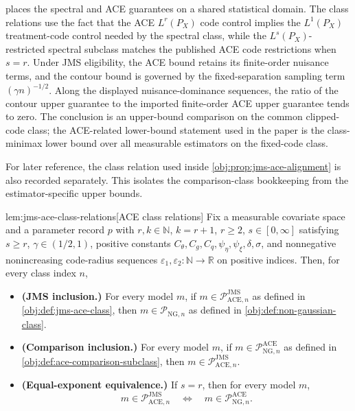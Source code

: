 \documentclass[11pt]{article}
\begin{document}
 places the spectral and ACE guarantees on a shared statistical domain. The class relations use the fact that the ACE \(L^r(P_X)\) code control implies the \(L^1(P_X)\) treatment-code control needed by the spectral class, while the \(L^s(P_X)\)-restricted spectral subclass matches the published ACE code restrictions when \(s=r\). Under JMS eligibility, the ACE bound retains its finite-order nuisance terms, and the contour bound is governed by the fixed-separation sampling term \((\gamma n)^{-1/2}\). Along the displayed nuisance-dominance sequences, the ratio of the contour upper guarantee to the imported finite-order ACE upper guarantee tends to zero. The conclusion is an upper-bound comparison on the common clipped-code class; the ACE-related lower-bound statement used in the paper is the class-minimax lower bound over all measurable estimators on the fixed-code class.

For later reference, the class relation used inside \cref{obj:prop:jms-ace-alignment} is also recorded separately. This isolates the comparison-class bookkeeping from the estimator-specific upper bounds.

\begin{lemmav}{lem:jms-ace-class-relations}[ACE class relations]
Fix a measurable covariate space and a parameter record \(p\) with \(r,k\in\mathbb N\), \(k=r+1\), \(r\ge2\), \(s\in[0,\infty]\) satisfying \(s\ge r\), \(\gamma\in(1/2,1)\), positive constants \(C_{\theta},C_g,C_q,\psi_{\eta},\psi_{\xi},\delta,\sigma\), and nonnegative nonincreasing code-radius sequences \(\varepsilon_1,\varepsilon_2:\mathbb N\to\mathbb R\) on positive indices.  Then, for every class index \(n\),
\begin{itemize}
\item \textbf{(JMS inclusion.)} For every model \(m\), if \(m\in\mathcal P_{\mathrm{ACE},n}^{\mathrm{JMS}}\) as defined in \cref{obj:def:jms-ace-class}, then \(m\in\mathcal P_{\mathrm{NG},n}\) as defined in \cref{obj:def:non-gaussian-class}.
\item \textbf{(Comparison inclusion.)} For every model \(m\), if \(m\in\mathcal P_{\mathrm{NG},n}^{\mathrm{ACE}}\) as defined in \cref{obj:def:ace-comparison-subclass}, then \(m\in\mathcal P_{\mathrm{ACE},n}^{\mathrm{JMS}}\).
\item \textbf{(Equal-exponent equivalence.)} If \(s=r\), then for every model \(m\),
\[
m\in\mathcal P_{\mathrm{ACE},n}^{\mathrm{JMS}}
\quad\Longleftrightarrow\quad
m\in\mathcal P_{\mathrm{NG},n}^{\mathrm{ACE}} .
\]
\end{itemize}
\end{lemmav}
\end{document}
